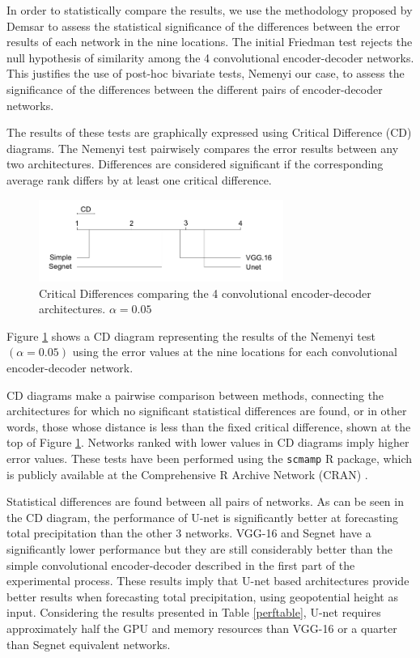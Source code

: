 \documentclass[twocol]{ametsoc}
\begin{document}
In order to statistically compare the results, we use the methodology proposed by Demsar \citep{demsar2006} to assess the statistical significance of the differences between the error results of each network in the nine locations. The initial Friedman test rejects the null hypothesis of similarity among the 4 convolutional encoder-decoder networks. This justifies the use of post-hoc bivariate tests, Nemenyi \citep{pohlert2014pairwise} our case, to assess the significance of the differences between the different pairs of encoder-decoder networks. 

The results of these tests are graphically expressed using Critical Difference (CD) diagrams. The Nemenyi test pairwisely compares the error results between any two architectures. Differences are considered significant if the corresponding average rank differs by at least one critical difference.

\begin{figure}[h]
 \centerline{\includegraphics[width=8cm]{CD.png}}
  \caption{Critical Differences comparing the 4 convolutional encoder-decoder architectures. $\alpha = 0.05$ }\label{CD}
\end{figure}

Figure \ref{CD} shows a CD diagram representing the results of the Nemenyi test $(\alpha = 0.05)$ using the error values at the nine locations for each convolutional encoder-decoder network. 

CD diagrams make a pairwise comparison between methods, connecting the architectures for which no significant statistical differences are found, or in other words, those whose distance is less than the fixed critical difference, shown at the top of Figure \ref{CD}. Networks ranked with lower values in CD diagrams imply higher error values. These tests have been performed using the \texttt{scmamp} R package, which is publicly available at the Comprehensive R Archive Network (CRAN) \citep{calvo2015}. 

Statistical differences are found between all pairs of networks. As can be seen in the CD diagram, the performance of U-net is significantly better at forecasting total precipitation than the other 3 networks. VGG-16 and Segnet have a significantly lower performance but they are still considerably better than the simple convolutional encoder-decoder described in the first part of the experimental process. These results imply that U-net based architectures provide better results when forecasting total precipitation, using geopotential height as input. Considering the results presented in Table \ref{perftable}, U-net requires approximately half the GPU and memory resources than VGG-16 or a quarter than Segnet equivalent networks.
\end{document}
